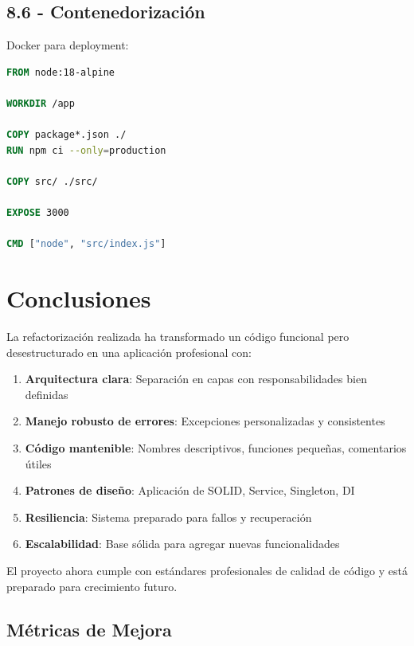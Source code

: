 \documentclass[12pt,a4paper]{article}
\begin{document}
\subsection{8.6 - Contenedorización}
Docker para deployment:
\begin{lstlisting}[language=Dockerfile]
FROM node:18-alpine

WORKDIR /app

COPY package*.json ./
RUN npm ci --only=production

COPY src/ ./src/

EXPOSE 3000

CMD ["node", "src/index.js"]
\end{lstlisting}

\newpage

\section{Conclusiones}

La refactorización realizada ha transformado un código funcional pero desestructurado en una aplicación profesional con:

\begin{enumerate}
    \item \textbf{Arquitectura clara}: Separación en capas con responsabilidades bien definidas
    \item \textbf{Manejo robusto de errores}: Excepciones personalizadas y consistentes
    \item \textbf{Código mantenible}: Nombres descriptivos, funciones pequeñas, comentarios útiles
    \item \textbf{Patrones de diseño}: Aplicación de SOLID, Service, Singleton, DI
    \item \textbf{Resiliencia}: Sistema preparado para fallos y recuperación
    \item \textbf{Escalabilidad}: Base sólida para agregar nuevas funcionalidades
\end{enumerate}

El proyecto ahora cumple con estándares profesionales de calidad de código y está preparado para crecimiento futuro.

\subsection{Métricas de Mejora}
\end{document}
